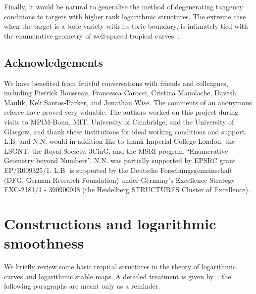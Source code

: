 \documentclass[11pt]{amsart}
\theoremstyle{definition}
\theoremstyle{definition}
\begin{document}
Finally, it would be natural to generalise the method of degenerating tangency conditions to targets with higher rank logarithmic structures. The extreme case when the target is a toric variety with its toric boundary, is intimately tied with the enumerative geometry of well-spaced tropical curves~\cite{LR18,RSPW2,Speyer}. %

\subsection*{Acknowledgements} We have benefited from fruitful conversations with friends and colleagues, including Pierrick Bousseau, Francesca Carocci, Cristina Manolache, Davesh Maulik, Keli Santos-Parker, and Jonathan Wise. The comments of an anonymous referee have proved very valuable. The authors worked on this project during visits to MPIM-Bonn, MIT, University of Cambridge, and the University of Glasgow, and thank these institutions for ideal working conditions and support. L.B. and N.N. would in addition like to thank Imperial College London, the LSGNT, the Royal Society, 3CinG, and the MSRI program ``Enumerative Geometry beyond Numbers''. N.N. was partially supported by EPSRC grant EP/R009325/1.  L.B. is supported by the Deutsche Forschungsgemeinschaft (DFG, German Research Foundation) under Germany’s Excellence Strategy EXC-2181/1 - 390900948 (the Heidelberg STRUCTURES Cluster of Excellence).


\section{Constructions and logarithmic smoothness}\label{section construction}
\noindent We briefly review some basic tropical structures in the theory of logarithmic curves and logarithmic stable maps. A detailed treatment is given by~\cite[Section~3]{CavalieriChanUlirschWise}; the following paragraphs are meant only as a reminder. 
\end{document}
